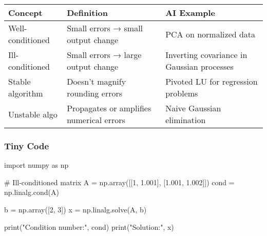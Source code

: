 \documentclass[
  letterpaper,
  DIV=11,
  numbers=noendperiod]{scrreprt}
\newenvironment{Shaded}{\begin{snugshade}}{\end{snugshade}}
\newcommand{\BuiltInTok}[1]{\textcolor[rgb]{0.00,0.23,0.31}{#1}}
\newcommand{\CommentTok}[1]{\textcolor[rgb]{0.37,0.37,0.37}{#1}}
\newcommand{\DecValTok}[1]{\textcolor[rgb]{0.68,0.00,0.00}{#1}}
\newcommand{\FloatTok}[1]{\textcolor[rgb]{0.68,0.00,0.00}{#1}}
\newcommand{\ImportTok}[1]{\textcolor[rgb]{0.00,0.46,0.62}{#1}}
\newcommand{\NormalTok}[1]{\textcolor[rgb]{0.00,0.23,0.31}{#1}}
\newcommand{\OperatorTok}[1]{\textcolor[rgb]{0.37,0.37,0.37}{#1}}
\newcommand{\StringTok}[1]{\textcolor[rgb]{0.13,0.47,0.30}{#1}}
\begin{document}
\begin{longtable}[]{@{}
  >{\raggedright\arraybackslash}p{}
  >{\raggedright\arraybackslash}p{}
  >{\raggedright\arraybackslash}p{}@{}}
\toprule\noalign{}
\begin{minipage}[b]{\linewidth}\raggedright
Concept
\end{minipage} & \begin{minipage}[b]{\linewidth}\raggedright
Definition
\end{minipage} & \begin{minipage}[b]{\linewidth}\raggedright
AI Example
\end{minipage} \\
\midrule\noalign{}
\endhead
\bottomrule\noalign{}
\endlastfoot
Well-conditioned & Small errors → small output change & PCA on
normalized data \\
Ill-conditioned & Small errors → large output change & Inverting
covariance in Gaussian processes \\
Stable algorithm & Doesn't magnify rounding errors & Pivoted LU for
regression problems \\
Unstable algo & Propagates or amplifies numerical errors & Naive
Gaussian elimination \\
\end{longtable}

\subsubsection{Tiny Code}\label{tiny-code-155}

\begin{Shaded}
\begin{Highlighting}[]
\ImportTok{import}\NormalTok{ numpy }\ImportTok{as}\NormalTok{ np}

\CommentTok{\# Ill{-}conditioned matrix}
\NormalTok{A }\OperatorTok{=}\NormalTok{ np.array([[}\DecValTok{1}\NormalTok{, }\FloatTok{1.001}\NormalTok{], [}\FloatTok{1.001}\NormalTok{, }\FloatTok{1.002}\NormalTok{]])}
\NormalTok{cond }\OperatorTok{=}\NormalTok{ np.linalg.cond(A)}

\NormalTok{b }\OperatorTok{=}\NormalTok{ np.array([}\DecValTok{2}\NormalTok{, }\DecValTok{3}\NormalTok{])}
\NormalTok{x }\OperatorTok{=}\NormalTok{ np.linalg.solve(A, b)}

\BuiltInTok{print}\NormalTok{(}\StringTok{"Condition number:"}\NormalTok{, cond)}
\BuiltInTok{print}\NormalTok{(}\StringTok{"Solution:"}\NormalTok{, x)}
\end{Highlighting}
\end{Shaded}
\end{document}
